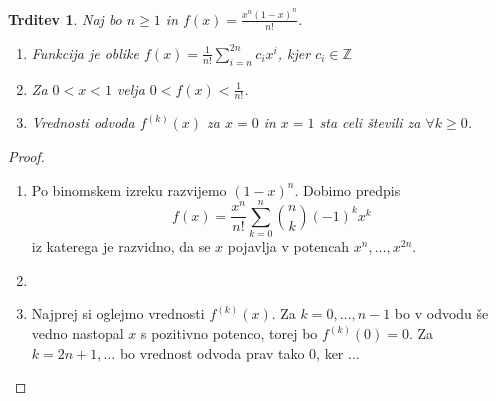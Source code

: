 \documentclass[a4paper]{article}
\theoremstyle{plain}
\newtheorem{trditev}{Trditev}
\newcommand{\odvod}[1]{f^{({#1})}(x)}
\begin{document}
\begin{trditev}
\label{tr:funkcijaf}
Naj bo $n\ge1$ in $f(x)=\frac{x^n(1-x)^n}{n!}$.
\begin{enumerate}
\item Funkcija je oblike $\displaystyle f(x)=\frac{1}{n!}\sum_{i=n}^{2n}c_ix^i$, kjer $c_i\in\mathbb{Z}$
\item Za $0<x<1$ velja $0<f(x)<\frac{1}{n!}$.
\item Vrednosti odvoda $\odvod{k}$ za $x=0$ in $x=1$ sta celi števili za $\forall k\ge0$.
\end{enumerate}
\end{trditev}

\begin{proof}
\begin{enumerate}
\item Po binomskem izreku razvijemo $(1-x)^n$. Dobimo predpis
\begin{equation*}
f(x) = \frac{x^n}{n!}\sum_{k=0}^{n}\binom{n}{k}(-1)^kx^k
\end{equation*}
iz katerega je razvidno, da se $x$ pojavlja v potencah $x^n,\dots, x^{2n}$.
\item
\item Najprej si oglejmo vrednosti $\odvod{k}$. Za $k=0,\dots,n-1$ bo v odvodu še vedno nastopal $x$ s pozitivno potenco, torej bo $f^{(k)}(0)=0$. Za $k=2n+1,\dots$ bo vrednost odvoda prav tako 0, ker ...
\end{enumerate}
\end{proof}
\end{document}
